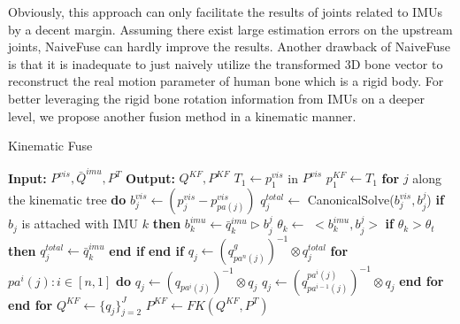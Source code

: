 \documentclass[lettersize,journal]{IEEEtran}
\begin{document}
Obviously, this approach can only facilitate the results of joints related to IMUs by a decent margin. Assuming there exist large estimation errors on the upstream joints, NaiveFuse can hardly improve the results. Another drawback of NaiveFuse is that it is inadequate to just naively utilize the transformed 3D bone vector to reconstruct the real motion parameter of human bone which is a rigid body. For better leveraging the rigid bone rotation information from IMUs on a deeper level, we propose another fusion method in a kinematic manner.

\begin{algorithm}[t] 
\caption{Kinematic Fuse}
\begin{algorithmic}
\STATE \textbf{Input:} $P^{vis}, \bar{Q}^{imu}, P^{T}$
\STATE \textbf{Output:} $Q^{KF}, P^{KF}$
\STATE \hspace{0.5cm} $T_{1} \gets p_{1}^{vis}$ in $P^{vis}$ 
\STATE \hspace{0.5cm} $p_{1}^{KF} \gets T_{1}$
\STATE \hspace{0.5cm} \textbf{for} $j$ along the kinematic tree \textbf{do}
\STATE \hspace{1cm} $b_{j}^{vis} \gets (p_{j}^{vis} - p_{pa(j)}^{vis})$
\STATE \hspace{1cm} $q_{j}^{total} \gets$ CanonicalSolve($b_{j}^{vis}, b_{j}^{j}$)
\STATE \hspace{1cm} \textbf{if} $b_{j}$ is attached with IMU $k$ \textbf{then}
\STATE \hspace{1.5cm} $b_{k}^{imu} \gets \bar{q}_{k}^{imu} \rhd b_{j}^{j}$
\STATE \hspace{1.5cm} $\theta_{k} \gets$  $<b_{k}^{imu}, b_{j}^{j}>$
\STATE \hspace{1.5cm} \textbf{if} $\theta_{k} > \theta_{t}$ \textbf{then}
\STATE \hspace{2.0cm} $q_{j}^{total} \gets \bar{q}_{k}^{imu}$
\STATE \hspace{1.5cm} \textbf{end if}
\STATE \hspace{1cm} \textbf{end if}
\STATE \hspace{1cm} $q_{j} \gets (q_{pa^{n}(j)}^{g})^{-1} \otimes q_{j}^{total}$
\STATE \hspace{1cm} \textbf{for} $pa^{i}(j): i \in [n,1] $ \textbf{do}
\STATE \hspace{1.5cm} $q_{j} \gets (q_{pa^{i}(j)})^{-1} \otimes q_{j}$
\STATE \hspace{1.5cm} $q_{j} \gets (q_{pa^{i-1}(j)}^{pa^{i}(j)})^{-1} \otimes q_{j}$
\STATE \hspace{1cm} \textbf{end for}
\STATE \hspace{0.5cm} \textbf{end for}
\STATE \hspace{0.5cm} $Q^{KF} \gets \lbrace q_{j} \rbrace_{j=2}^{J}$
\STATE \hspace{0.5cm} $P^{KF} \gets FK(Q^{KF}, P^{T})$
\end{algorithmic}
\label{alg1}
\end{algorithm}
\end{document}
